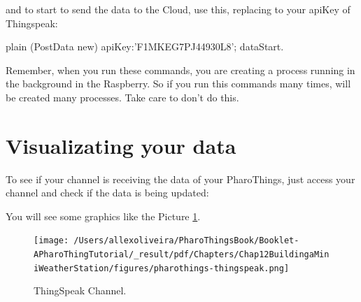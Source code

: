 \documentclass[10pt,twoside,english]{_support/latex/sbabook/sbabook}
\begin{document}
and to start to send the data to the Cloud, use this, replacing to your apiKey of Thingspeak:

\begin{displaycode}{plain}
(PostData new) apiKey:'F1MKEG7PJ44930L8'; dataStart.
\end{displaycode}

Remember, when you run these commands, you are creating a process running in the background in the Raspberry. So if you run this commands many times, will be created many processes. Take care to don't do this. 
\section{Visualizating your data}
To see if your channel is receiving the data of your PharoThings, just access your channel and check if the data is being updated:


You will see some graphics like the Picture \ref{ThingspeakChannel}. 


\begin{figure}

\begin{center}
\texttt{[image: /Users/allexoliveira/PharoThingsBook/Booklet-APharoThingTutorial/\_result/pdf/Chapters/Chap12BuildingaMiniWeatherStation/figures/pharothings-thingspeak.png]}\caption{ThingSpeak Channel.\label{ThingspeakChannel}}\end{center}
\end{figure}




\backmatter

\end{document}
